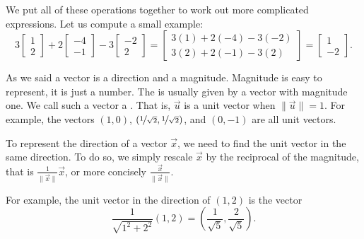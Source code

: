 \begin{myfig}
\capstart
{}
\caption{A vector $\vec{x}$, the vector $2\vec{x}$ (same direction,
double the magnitude), and the vector $-1.5\vec{x}$ (opposite direction,
1.5 times the magnitude).\label{linalg-vecscale:fig}}
\end{myfig}

We put all of these operations together to work out more complicated expressions.
Let us compute a small example:
\begin{equation*}
3
\begin{bmatrix}
1 \\ 2
\end{bmatrix}
+
2
\begin{bmatrix}
-4 \\ -1
\end{bmatrix} 
-
3
\begin{bmatrix}
-2 \\ 2
\end{bmatrix} 
=
\begin{bmatrix}
3(1)+2(-4)-3(-2) \\ 3(2)+2(-1)-3(2)
\end{bmatrix}
=
\begin{bmatrix}
1 \\ -2
\end{bmatrix}
.
\end{equation*}

\medskip

As we said a vector is a direction and a magnitude.  Magnitude is easy to
represent, it is just a number.  The \emph{} is usually
given by a vector with magnitude one.  We call such a vector a
\emph{}.  That is, $\vec{u}$ is a unit vector when
$\lVert \vec{u} \rVert = 1$.  For example, the vectors $(1,0)$,
$(\nicefrac{1}{\sqrt{2}},\nicefrac{1}{\sqrt{2}})$, and $(0,-1)$ are all
unit vectors.

To represent the direction of a vector $\vec{x}$, we need to find the 
unit vector in the same direction.  To do so, we simply rescale
$\vec{x}$ by the reciprocal of the magnitude, that is
$\frac{1}{\lVert \vec{x} \rVert} \vec{x}$, or more concisely
$\frac{\vec{x}}{\lVert \vec{x} \rVert}$.

For example, the unit vector in the direction of $(1,2)$ is the vector
\begin{equation*}
\frac{1}{\sqrt{1^2+2^2}} (1,2)
=
\left( \frac{1}{\sqrt{5}}, \frac{2}{\sqrt{5}} \right) .
\end{equation*}



